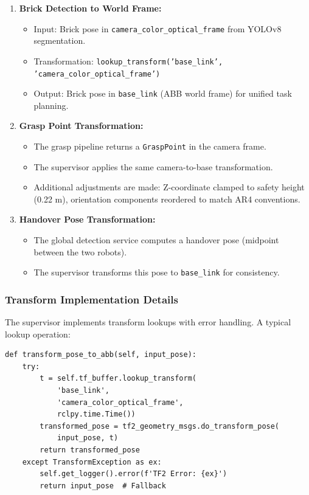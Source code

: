 \begin{enumerate}
    \item \textbf{Brick Detection to World Frame:}
    \begin{itemize}
        \item Input: Brick pose in \texttt{camera\_color\_optical\_frame} from YOLOv8 segmentation.
        \item Transformation: \texttt{lookup\_transform('base\_link', 'camera\_color\_optical\_frame')}
        \item Output: Brick pose in \texttt{base\_link} (ABB world frame) for unified task planning.
    \end{itemize}

    \item \textbf{Grasp Point Transformation:}
    \begin{itemize}
        \item The grasp pipeline returns a \texttt{GraspPoint} in the camera frame.
        \item The supervisor applies the same camera-to-base transformation.
        \item Additional adjustments are made: Z-coordinate clamped to safety height (0.22 m), orientation components reordered to match AR4 conventions.
    \end{itemize}

    \item \textbf{Handover Pose Transformation:}
    \begin{itemize}
        \item The global detection service computes a handover pose (midpoint between the two robots).
        \item The supervisor transforms this pose to \texttt{base\_link} for consistency.
    \end{itemize}
\end{enumerate}

\subsubsection{Transform Implementation Details}

The supervisor implements transform lookups with error handling. A typical lookup operation:

\begin{verbatim}
def transform_pose_to_abb(self, input_pose):
    try:
        t = self.tf_buffer.lookup_transform(
            'base_link', 
            'camera_color_optical_frame', 
            rclpy.time.Time())
        transformed_pose = tf2_geometry_msgs.do_transform_pose(
            input_pose, t)
        return transformed_pose
    except TransformException as ex:
        self.get_logger().error(f'TF2 Error: {ex}')
        return input_pose  # Fallback
\end{verbatim}

